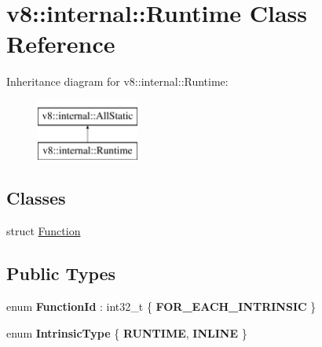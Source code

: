 \hypertarget{classv8_1_1internal_1_1Runtime}{}\section{v8\+:\+:internal\+:\+:Runtime Class Reference}
\label{classv8_1_1internal_1_1Runtime}
Inheritance diagram for v8\+:\+:internal\+:\+:Runtime\+:\begin{figure}[H]
\begin{center}
\leavevmode
\includegraphics[height=2.000000cm]{classv8_1_1internal_1_1Runtime}
\end{center}
\end{figure}
\subsection*{Classes}
\begin{DoxyCompactItemize}
\item 
struct \mbox{\hyperlink{structv8_1_1internal_1_1Runtime_1_1Function}{Function}}
\end{DoxyCompactItemize}
\subsection*{Public Types}
\begin{DoxyCompactItemize}
\item 
\mbox{\label{classv8_1_1internal_1_1Runtime_abc83b23b198d9aa173abb13a25a7b670}} 
enum {\bfseries Function\+Id} \+: int32\+\_\+t \{ {\bfseries F\+O\+R\+\_\+\+E\+A\+C\+H\+\_\+\+I\+N\+T\+R\+I\+N\+S\+IC}
 \}
\item 
\mbox{\label{classv8_1_1internal_1_1Runtime_a9794fd24ae9e4731fe6679eca11fef02}} 
enum {\bfseries Intrinsic\+Type} \{ {\bfseries R\+U\+N\+T\+I\+ME}, 
{\bfseries I\+N\+L\+I\+NE}
 \}
\end{DoxyCompactItemize}
